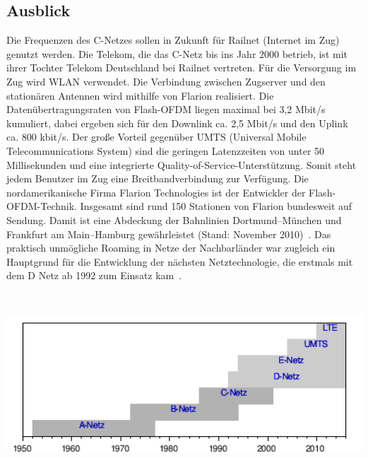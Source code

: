 \begin{multicols}{3}
\subsection*{Ausblick}
Die Frequenzen des C-Netzes sollen in Zukunft für Railnet (Internet im Zug) genutzt werden. Die Telekom, die das C-Netz bis ins Jahr 2000 betrieb, ist mit ihrer Tochter Telekom Deutschland bei Railnet vertreten. Für die Versorgung im Zug wird WLAN verwendet. Die Verbindung zwischen Zugserver und den stationären Antennen wird mithilfe von Flarion realisiert. Die Datenübertragungsraten von Flash-OFDM liegen maximal bei 3,2 Mbit/s kumuliert, dabei ergeben sich für den Downlink ca. 2,5 Mbit/s und den Uplink ca. 800 kbit/s. Der große Vorteil gegenüber UMTS (Universal Mobile Telecommunications System) sind die geringen Latenzzeiten von unter 50 Millisekunden und eine integrierte Quality-of-Service-Unterstützung. Somit steht jedem Benutzer im Zug eine Breitbandverbindung zur Verfügung. 
Die nordamerikanische Firma Flarion Technologies ist der Entwickler der Flash-OFDM-Technik. Insgesamt sind rund 150 Stationen von Flarion bundesweit auf Sendung. Damit ist eine Abdeckung der Bahnlinien Dortmund–München und Frankfurt am Main–Hamburg gewährleistet (Stand: November 2010)~\cite{c-netz.3}.
Das praktisch unmögliche Roaming in Netze der Nachbarländer war zugleich ein Hauptgrund für die Entwicklung der nächsten Netztechnologie, die erstmals mit dem D Netz ab 1992 zum Einsatz kam~\cite{c-netz.1}.
\printbibliography[segment=12,heading=subbibliography]
\end{multicols}
\begin{Figure}
\centering
\includegraphics[height=68mm]{Kapitel/C-Netz/Grafiken/ZeitstrahlWiki.png}
\end{Figure}
\newpage